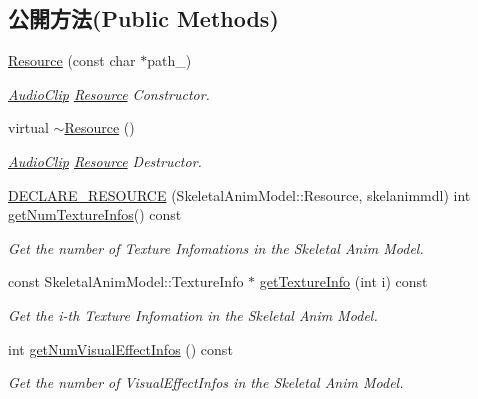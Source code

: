 \subsection*{公開方法(Public Methods)}
\begin{DoxyCompactItemize}
\item 
\hyperlink{class_magnum_1_1endif_1_1_resource_a8cf875365da18007a0064ed610092612}{Resource} (const char $\ast$path\+\_\+)
\begin{DoxyCompactList}\small\item\em \hyperlink{class_magnum_1_1_audio_clip}{Audio\+Clip} \hyperlink{class_magnum_1_1endif_1_1_resource}{Resource} Constructor. \end{DoxyCompactList}\item 
virtual \hyperlink{class_magnum_1_1endif_1_1_resource_a3a887409e63d3406c36e4f2eac23ffe0}{$\sim$\+Resource} ()
\begin{DoxyCompactList}\small\item\em \hyperlink{class_magnum_1_1_audio_clip}{Audio\+Clip} \hyperlink{class_magnum_1_1endif_1_1_resource}{Resource} Destructor. \end{DoxyCompactList}\item 
\hyperlink{class_magnum_1_1endif_1_1_resource_ac273cf7380dc91a497bc40933e573afe}{D\+E\+C\+L\+A\+R\+E\+\_\+\+R\+E\+S\+O\+U\+R\+CE} (Skeletal\+Anim\+Model\+::\+Resource, skelanimmdl) int \hyperlink{class_magnum_1_1endif_af7894c43a6807d42c1ddd026a61fb9cd}{get\+Num\+Texture\+Infos}() const 
\begin{DoxyCompactList}\small\item\em Get the number of Texture Infomations in the Skeletal Anim Model. \end{DoxyCompactList}\item 
const Skeletal\+Anim\+Model\+::\+Texture\+Info $\ast$ \hyperlink{class_magnum_1_1endif_1_1_resource_a8929047a1035638892d1103e989ccf0a}{get\+Texture\+Info} (int i) const 
\begin{DoxyCompactList}\small\item\em Get the i-\/th Texture Infomation in the Skeletal Anim Model. \end{DoxyCompactList}\item 
int \hyperlink{class_magnum_1_1endif_1_1_resource_a77e3e4105608e24dba175a414559c07f}{get\+Num\+Visual\+Effect\+Infos} () const 
\begin{DoxyCompactList}\small\item\em Get the number of Visual\+Effect\+Infos in the Skeletal Anim Model. \end{DoxyCompactList}\item 

\end{DoxyCompactItemize}
